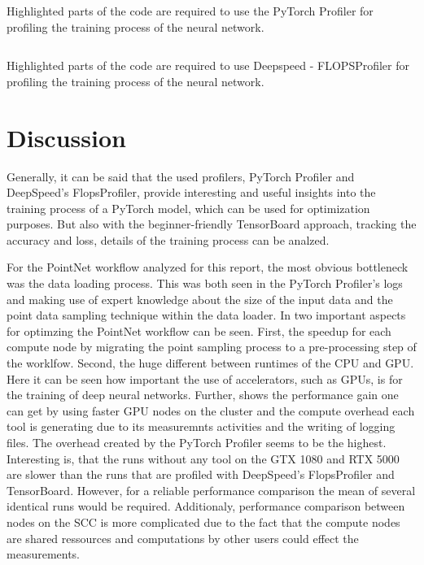 \documentclass[12pt, a4paper, hidelinks]{article}
\begin{document}
\begin{listing}[H]
\inputminted[breaklines, xleftmargin=1em,linenos,fontsize=\small, highlightlines={4-10,14,15}]{python}{./assets/profiler-torch.py}
\caption[Code example for PyTorch - Profiler]{Highlighted parts of the code are required to use the PyTorch Profiler for profiling the training process of the neural network.}
\label{lst:profiler-torch}
\end{listing}

\begin{listing}[H]
\inputminted[xleftmargin=1em,linenos,fontsize=\small, highlightlines={1,3,4,8,9,11-18}]{python}{./assets/deepspeed.py}
\caption[Code example for Deepspeed - FLOPSProfiler]{Highlighted parts of the code are required to use Deepspeed - FLOPSProfiler for profiling the training process of the neural network.}
\label{lst:deepspeed}
\end{listing}


\section{Discussion}
\label{sec:discussion}

Generally, it can be said that the used profilers, PyTorch Profiler and DeepSpeed's FlopsProfiler, provide interesting and useful insights into the training process of a PyTorch model, which can be used for optimization purposes. But also with the beginner-friendly TensorBoard approach, tracking the accuracy and loss, details of the training process can be analzed.

For the PointNet workflow analyzed for this report, the most obvious bottleneck was the data loading process. This was both seen in the PyTorch Profiler's logs and making use of expert knowledge about the size of the input data and the point data sampling technique within the data loader. 
In  two important aspects for optimzing the PointNet workflow can be seen. First, the speedup for each compute node by migrating the point sampling process to a pre-processing step of the worklfow. Second, the huge different between runtimes of the \ac{CPU} and \ac{GPU}. Here it can be seen how important the use of accelerators, such as \ac{GPU}s, is for the training of deep neural networks.
Further,  shows the performance gain one can get by using faster \ac{GPU} nodes on the cluster and the compute overhead each tool is generating due to its measuremnts activities and the writing of logging files. The overhead created by the PyTorch Profiler seems to be the highest. Interesting is, that the runs without any tool on the GTX 1080 and RTX 5000 are slower than the runs that are profiled with DeepSpeed's FlopsProfiler and TensorBoard.
However, for a reliable performance comparison the mean of several identical runs would be required. Additionaly, performance comparison between nodes on the \ac{SCC} is more complicated due to the fact that the compute nodes are shared ressources and computations by other users could effect the measurements. 
\end{document}
